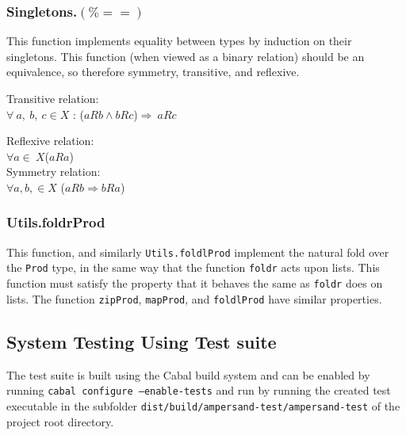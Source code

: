\subsubsection*{Singletons.$(\%==)$} 
This function implements equality between types by induction on their singletons.
This function (when viewed as a binary relation) should be an equivalence, 
so therefore symmetry, transitive, and reflexive. 

Transitive relation: \\
        $\forall\ a,\ b,\ c \in  X$ : ($aRb \wedge bRc$)$ \Rightarrow\ aRc$
        
Reflexive relation: \\
        $\forall a \in\ X $($aRa$)   \\
         
Symmetry relation: \\
        $\forall a, b, \in X$ ($aRb \Rightarrow bRa$) \\

\subsubsection*{Utils.foldrProd}
This function, and similarly \lstinline{Utils.foldlProd} implement
the natural fold over the \lstinline{Prod} type, in the same way that 
the function \lstinline{foldr} acts upon lists. This function
must satisfy the property that it behaves the same as \lstinline{foldr}
does on lists. The function \lstinline{zipProd}, \lstinline{mapProd}, and \lstinline{foldlProd}
have similar properties. 


\subsection{System Testing Using Test suite}
The test suite is built using the Cabal build system and can be 
enabled by running \texttt{cabal configure --enable-tests} and
run by running the created test executable in the subfolder
\texttt{dist/build/ampersand-test/ampersand-test} of the 
project root directory. 


